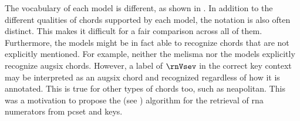 
The vocabulary of each model is different, as shown in
. In addition to the different
qualities of chords supported by each model, the notation is
also often distinct. This makes it difficult for a fair
comparison across all of them. Furthermore, the models might
be in fact able to recognize chords that are not explicitly
mentioned. For example, neither the \gls{melisma} nor the
\textcite{mcleod2021modular} models explicitly recognize
\gls{augsix} chords. However, a label of $\rnVsev$ in the
correct key context may be interpreted as an \gls{augsix}
chord and recognized regardless of how it is annotated. This
is true for other types of chords too, such as
\gls{neapolitan}. This was a motivation to propose the
\algorithmrn{} (see
)
algorithm for the retrieval of \gls{rna} numerators from
\gls{pcset} and keys. 

